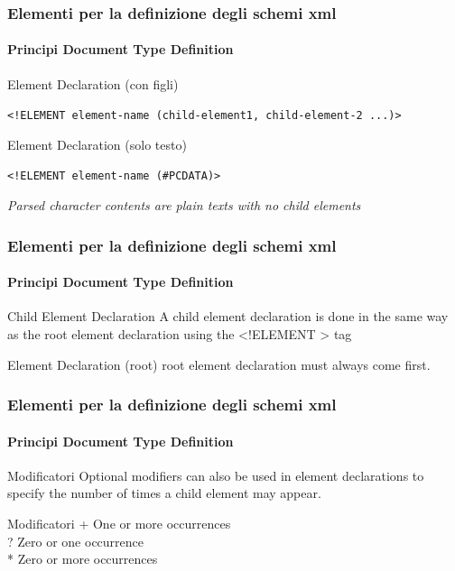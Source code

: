 \begin{frame}
    \frametitle{Elementi per la definizione degli schemi xml}
    \framesubtitle{Principi Document Type Definition}
    \addtocounter{nframe}{1}

    \begin{block}{Element Declaration (con figli)}
        \begin{center}\texttt{<!ELEMENT element-name (child-element1, child-element-2 ...)>}\end{center}
    \end{block}

    \begin{block}{Element Declaration (solo testo)}
    \begin{center}\texttt{<!ELEMENT element-name (\#PCDATA)>}\end{center}
    \end{block}
    \textit{Parsed character contents are plain texts with no child elements}
\end{frame}

\begin{frame}
    \frametitle{Elementi per la definizione degli schemi xml}
    \framesubtitle{Principi Document Type Definition}
    \addtocounter{nframe}{1}

    \begin{block}{Child Element Declaration}
        A child element declaration is done in the same way as the root element declaration using the <!ELEMENT > tag
    \end{block}

    \begin{block}{Element Declaration (root)}
     root element declaration must always come first.
    \end{block}
\end{frame}


\begin{frame}
    \frametitle{Elementi per la definizione degli schemi xml}
    \framesubtitle{Principi Document Type Definition}
    \addtocounter{nframe}{1}

    \begin{block}{Modificatori}
        Optional modifiers can also be used in element declarations to specify the
        number of times a child element may appear.
    \end{block}

    \begin{block}{Modificatori}
     + One or more occurrences\\ 
     ? Zero or one occurrence\\
     * Zero or more occurrences\\
    \end{block}
\end{frame}

